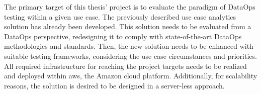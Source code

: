 The primary target of this thesis' project is to evaluate the paradigm of DataOps testing within a given use case. The previously described use case analytics solution has already been developed. This solution needs to be evaluated from a DataOps perspective, redesigning it to comply with state-of-the-art DataOps methodologies and standards. Then, the new solution needs to be enhanced with suitable testing frameworks, considering the use case circumstances and priorities. All required infrastructure for reaching the project targets needs to be realized and deployed within \ac{aws}, the Amazon cloud platform. Additionally, for scalability reasons, the solution is desired to be designed in a server-less approach.